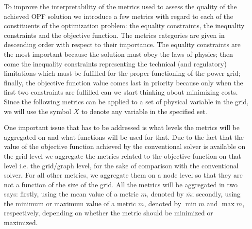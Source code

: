 To improve the interpretability of the metrics used to assess the quality of the achieved OPF solution
we introduce a few metrics with regard to each of the constituents of the optimization problem:
the equality constraints, the inequality constraints and the objective function.
The metrics categories are given in descending order with respect to their importance.
The equality constraints are the most important because the solution must obey the laws of physics;
then come the inequality constraints representing the technical (and regulatory) limitations
which must be fulfilled for the proper functioning of the power grid;
finally, the objective function value comes last in priority because only when the
first two constraints are fulfilled can we start thinking about minimizing costs.
Since the following metrics can be applied to a set of physical variable in the grid,
we will use the symbol $X$ to denote any variable in the specified set.


One important issue that has to be addressed is what levels the metrics will be aggregated on and
what functions will be used for that.
Due to the fact that the value of the objective function achieved by the conventional solver is available
on the grid level we aggregate the metrics related to the objective function on that level i.e. the
grid/graph level, for the sake of comparison with the conventional solver.
For all other metrics, we aggregate them on a node level so that they are not a function of the size of
the grid.
All the metrics will be aggregated in two says: firstly, using the mean value of a metric $m$, denoted
by $\overline{m}$; secondly, using the minimum or maximum value of a metric $m$, denoted
by $\min m $ and $\max m $, respectively, depending on whether the metric
should be minimized or maximized.